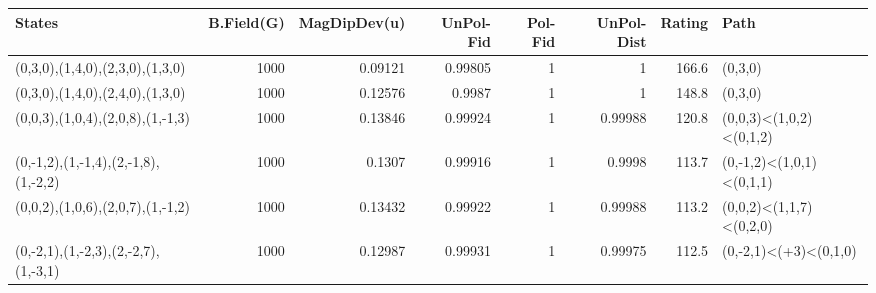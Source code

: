 \begin{tabular}{lrrrrrrl}
\hline
 States                              &   B.Field(G) &   MagDipDev(u) &   UnPol-Fid &   Pol-Fid &   UnPol-Dist &   Rating & Path                     \\
\hline
 (0,3,0),(1,4,0),(2,3,0),(1,3,0)     &         1000 &        0.09121 &     0.99805 &         1 &      1       &    166.6 & (0,3,0)                  \\
 (0,3,0),(1,4,0),(2,4,0),(1,3,0)     &         1000 &        0.12576 &     0.9987  &         1 &      1       &    148.8 & (0,3,0)                  \\
 (0,0,3),(1,0,4),(2,0,8),(1,-1,3)    &         1000 &        0.13846 &     0.99924 &         1 &      0.99988 &    120.8 & (0,0,3)<(1,0,2)<(0,1,2)  \\
 (0,-1,2),(1,-1,4),(2,-1,8),(1,-2,2) &         1000 &        0.1307  &     0.99916 &         1 &      0.9998  &    113.7 & (0,-1,2)<(1,0,1)<(0,1,1) \\
 (0,0,2),(1,0,6),(2,0,7),(1,-1,2)    &         1000 &        0.13432 &     0.99922 &         1 &      0.99988 &    113.2 & (0,0,2)<(1,1,7)<(0,2,0)  \\
 (0,-2,1),(1,-2,3),(2,-2,7),(1,-3,1) &         1000 &        0.12987 &     0.99931 &         1 &      0.99975 &    112.5 & (0,-2,1)<(+3)<(0,1,0)    \\
\hline
\end{tabular}